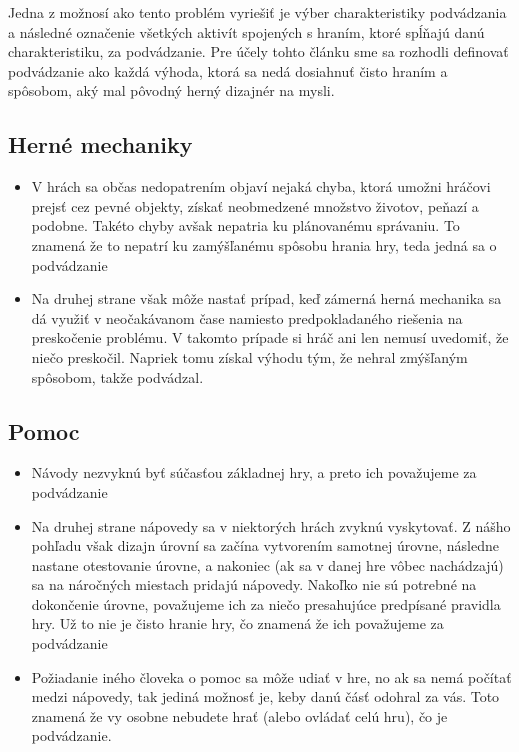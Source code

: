 \documentclass[10pt,twoside,slovak,a4paper]{article}
\begin{document}
Jedna z možnosí ako tento problém vyriešiť je výber charakteristiky podvádzania a následné označenie všetkých aktivít spojených s hraním, ktoré spĺňajú danú charakteristiku, za podvádzanie. Pre účely tohto článku sme sa rozhodli definovať podvádzanie ako každá výhoda, ktorá sa nedá dosiahnuť čisto hraním a spôsobom, aký mal pôvodný herný dizajnér na mysli.

\subsection{Herné mechaniky}
\begin{itemize}
\item V hrách sa občas nedopatrením objaví nejaká chyba, ktorá umožni hráčovi prejsť cez pevné objekty, získať neobmedzené množstvo životov, peňazí a podobne. Takéto chyby avšak nepatria ku plánovanému správaniu. To znamená že to nepatrí ku zamýšľanému spôsobu hrania hry, teda jedná sa o podvádzanie

\item Na druhej strane však môže nastať prípad, keď zámerná herná mechanika sa dá využiť v neočakávanom čase namiesto predpokladaného riešenia na preskočenie problému. V takomto prípade si hráč ani len nemusí uvedomiť, že niečo preskočil. Napriek tomu získal výhodu tým, že nehral zmýšľaným spôsobom, takže podvádzal.
\end{itemize}

\subsection{Pomoc}
\begin{itemize}
\item Návody nezvyknú byť súčasťou základnej hry, a preto ich považujeme za podvádzanie
\item Na druhej strane nápovedy sa v niektorých hrách zvyknú vyskytovať. Z nášho pohľadu však dizajn úrovní sa začína vytvorením samotnej úrovne, následne nastane otestovanie úrovne, a nakoniec (ak sa v danej hre vôbec nachádzajú) sa na náročných miestach pridajú nápovedy. Nakoľko nie sú potrebné na dokončenie úrovne, považujeme ich za niečo presahujúce predpísané pravidla hry. Už to nie je čisto hranie hry, čo znamená že ich považujeme za podvádzanie
\item Požiadanie iného človeka o pomoc sa môže udiať v hre, no ak sa nemá počítať medzi nápovedy, tak jediná možnosť je, keby danú čásť odohral za vás. Toto znamená že vy osobne nebudete hrať (alebo ovládať celú hru), čo je podvádzanie.
\end{itemize}
\end{document}
